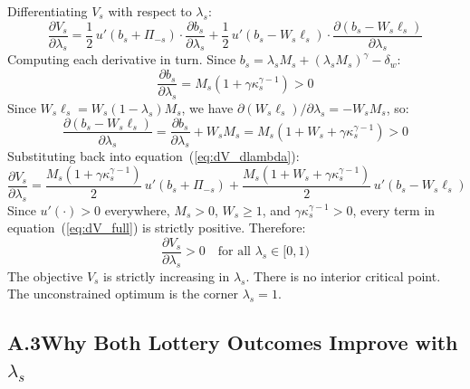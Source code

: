 \documentclass[12pt,a4paper]{article}
\begin{document}
Differentiating $V_s$ with respect to $\lambda_s$:
\begin{equation}
  \frac{\partial V_s}{\partial\lambda_s}
  = \frac{1}{2}\,u'(b_s + \Pi_{-s})\cdot\frac{\partial b_s}{\partial\lambda_s}
  + \frac{1}{2}\,u'(b_s - W_s\ell_s)
    \cdot\frac{\partial(b_s - W_s\ell_s)}{\partial\lambda_s}
  \tag{A.6}
  \label{eq:dV_dlambda}
\end{equation}
Computing each derivative in turn. Since $b_s = \lambda_s M_s +
(\lambda_s M_s)^\gamma - \delta_w$:
\begin{equation}
  \frac{\partial b_s}{\partial\lambda_s}
  = M_s\left(1 + \gamma\kappa_s^{\gamma-1}\right) > 0
  \tag{A.7}
  \label{eq:dbs_dlambda}
\end{equation}
Since $W_s\ell_s = W_s(1-\lambda_s)M_s$, we have
$\partial(W_s\ell_s)/\partial\lambda_s = -W_s M_s$, so:
\begin{equation}
  \frac{\partial(b_s - W_s\ell_s)}{\partial\lambda_s}
  = \frac{\partial b_s}{\partial\lambda_s} + W_s M_s
  = M_s\left(1 + W_s + \gamma\kappa_s^{\gamma-1}\right) > 0
  \tag{A.8}
  \label{eq:dlose_dlambda}
\end{equation}
Substituting back into equation~(\ref{eq:dV_dlambda}):
\begin{equation}
  \frac{\partial V_s}{\partial\lambda_s}
  = \frac{M_s(1+\gamma\kappa_s^{\gamma-1})}{2}\,u'(b_s+\Pi_{-s})
  + \frac{M_s(1+W_s+\gamma\kappa_s^{\gamma-1})}{2}\,u'(b_s-W_s\ell_s)
  \tag{A.9}
  \label{eq:dV_full}
\end{equation}
Since $u'(\cdot) > 0$ everywhere, $M_s > 0$, $W_s \geq 1$, and
$\gamma\kappa_s^{\gamma-1} > 0$, every term in equation~(\ref{eq:dV_full})
is strictly positive. Therefore:
\begin{equation}
  \frac{\partial V_s}{\partial\lambda_s} > 0
  \quad \text{for all } \lambda_s \in [0,1)
  \tag{A.10}
  \label{eq:monotone}
\end{equation}
The objective $V_s$ is strictly increasing in $\lambda_s$. There is no
interior critical point. The unconstrained optimum is the corner
$\lambda_s = 1$.

\subsection*{A.3\quad Why Both Lottery Outcomes Improve with $\lambda_s$}
\end{document}
